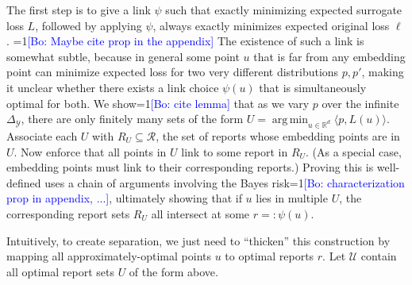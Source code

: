 \documentclass[12pt]{article}
\newcommand{\Comments}{1}
\newcommand{\mynote}[2]{\ifnum\Comments=1\textcolor{#1}{#2}\fi}
\newcommand{\bo}[1]{\mynote{blue}{[Bo: #1]}}
\newcommand{\reals}{\mathbb{R}}
\newcommand{\prop}[1]{\mathrm{prop}[#1]}
\newcommand{\simplex}{\Delta_\Y}
\newcommand{\R}{\mathcal{R}}
\newcommand{\U}{\mathcal{U}}
\newcommand{\Y}{\mathcal{Y}}
\newcommand{\toto}{\rightrightarrows}
\newcommand{\trim}{\mathrm{trim}}
\DeclareMathOperator*{\argmin}{arg\,min}
\newtheorem{lemma}{Lemma}
\newtheorem{proposition}{Proposition}
\begin{document}
The first step is to give a link $\psi$ such that exactly minimizing expected surrogate loss $L$, followed by applying $\psi$, always exactly minimizes expected original loss $\ell$.
\bo{Maybe cite prop in the appendix}
The existence of such a link is somewhat subtle, because in general some point $u$ that is far from any embedding point can minimize expected loss for two very different distributions $p,p'$, making it unclear whether there exists a link choice $\psi(u)$ that is simultaneously optimal for both.
We show\bo{cite lemma} that as we vary $p$ over the infinite $\simplex$, there are only finitely many sets of the form $U = \argmin_{u \in \reals^d} \langle p, L(u) \rangle$.
Associate each $U$ with $R_U \subseteq \R$, the set of reports whose embedding points are in $U$.
Now enforce that all points in $U$ link to some report in $R_U$.
(As a special case, embedding points must link to their corresponding reports.)
Proving this is well-defined uses a chain of arguments involving the Bayes risk\bo{characterization prop in appendix, ...}, ultimately showing that if $u$ lies in multiple $U$, the corresponding report sets $R_U$ all intersect at some $r =: \psi(u)$.

%

Intuitively, to create separation, we just need to ``thicken'' this construction by mapping all approximately-optimal points $u$ to optimal reports $r$.
Let $\U$ contain all optimal report sets $U$ of the form above.

\end{document}
